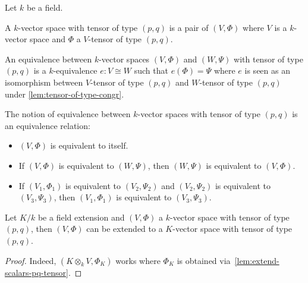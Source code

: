 Let $k$ be a field.

\begin{definition}
  A $k$-vector space with tensor of type $(p, q)$ is a pair of $(V, \Phi)$ where $V$ is a $k$-vector space and $\Phi$ a $V$-tensor of type $(p, q)$.
  \leanok%
\end{definition}

\begin{definition}
  An equivalence between $k$-vector spaces $(V, \Phi)$ and $(W, \Psi)$ with tensor of type $(p, q)$ is a $k$-equivalence $e : V \cong W$ such that $e(\Phi) = \Psi$ where $e$ is seen as an isomorphism between $V$-tensor of type $(p, q)$ and $W$-tensor of type $(p, q)$ under \cref{lem:tensor-of-type-congr}.
  \leanok%
\end{definition}

\begin{lemma}
  The notion of equivalence between $k$-vector spaces with tensor of type $(p, q)$ is an equivalence relation:
  \begin{itemize}
    \item $(V, \Phi)$ is equivalent to itself.
    \item If $(V, \Phi)$ is equivalent to $(W, \Psi)$, then $(W, \Psi)$ is equivalent to $(V, \Phi)$.
    \item If $(V_{1}, \Phi_{1})$ is equivalent to $(V_{2}, \Psi_{2})$ and $(V_{2}, \Psi_{2})$ is equivalent to $(V_{3}, \Psi_{3})$, then $(V_{1}, \Phi_{1})$ is equivalent to $(V_{3}, \Psi_{3})$.
  \end{itemize}
  \leanok%
\end{lemma}

\begin{lemma}\label{lem:extend-scalars-vector-space-with-tensor}
  \leanok%
  Let $K/k$ be a field extension and $(V, \Phi)$ a $k$-vector space with tensor of type $(p,q)$, then $(V, \Phi)$ can be extended to a $K$-vector space with tensor of type $(p,q)$.
\end{lemma}
\begin{proof}
  Indeed, $(K \otimes_{k} V, \Phi_{K})$ works where $\Phi_{K}$ is obtained via~\cref{lem:extend-scalars-pq-tensor}.
\end{proof}


